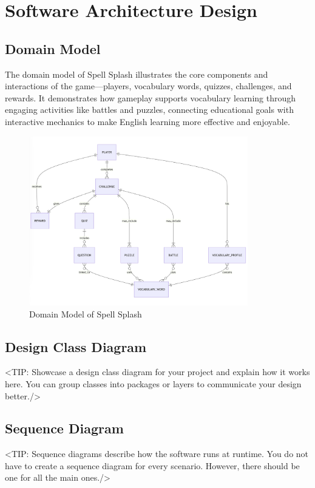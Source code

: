 \chapter{Software Architecture Design}
\label{chap:software-architecture-design}

\section{Domain Model}
\label{section:domain-model}
The domain model of Spell Splash illustrates the core components and interactions of the game—players, 
vocabulary words, quizzes, challenges, and rewards. It demonstrates how gameplay supports vocabulary 
learning through engaging activities like battles and puzzles, connecting educational goals with interactive 
mechanics to make English learning more effective and enjoyable.
\begin{figure}[H]
    \centering
    \includegraphics[width=0.85\textwidth]{assets/ku/er_diagram.png}
    \caption{Domain Model of Spell Splash}
    \label{fig:domain-model}
\end{figure}

\section{Design Class Diagram}
\label{section:design-class-diagram}
<TIP: Showcase a design class diagram for your project and explain
how it works here. You can group classes into packages or layers to communicate your
design better./>

\section{Sequence Diagram}
\label{section:sequence-diagram}
<TIP: Sequence diagrams describe how the software runs at runtime.
You do not have to create a sequence diagram for every scenario. However,
there should be one for all the main ones./>

